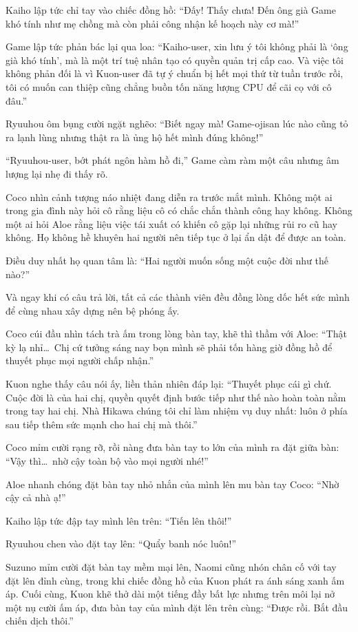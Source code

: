 ﻿\documentclass[../main.tex]{subfiles}
\begin{document}
Kaiho lập tức chỉ tay vào chiếc đồng hồ: ``Đấy! Thấy chưa! Đến ông già Game khó tính như mẹ chồng mà còn phải công nhận kế hoạch này cơ mà!''

Game lập tức phản bác lại qua loa: ``Kaiho-user, xin lưu ý tôi không phải là `ông già khó tính', mà là một trí tuệ nhân tạo có quyền quản trị cấp cao. Và việc tôi không phản đối là vì Kuon-user đã tự ý chuẩn bị hết mọi thứ từ tuần trước rồi, tôi có muốn can thiệp cũng chẳng buồn tốn năng lượng CPU để cãi cọ với cô đâu.''

Ryuuhou ôm bụng cười ngặt nghẽo: ``Biết ngay mà! Game-ojisan lúc nào cũng tỏ ra lạnh lùng nhưng thật ra là ủng hộ hết mình đúng không!''

``Ryuuhou-user, bớt phát ngôn hàm hồ đi,'' Game càm ràm một câu nhưng âm lượng lại nhẹ đi thấy rõ.

Coco nhìn cảnh tượng náo nhiệt đang diễn ra trước mắt mình.  Không một ai trong gia đình này hỏi cô rằng liệu cô có chắc chắn thành công hay không. Không một ai hỏi Aloe rằng liệu việc tái xuất có khiến cô gặp lại những rủi ro cũ hay không. Họ không hề khuyên hai người nên tiếp tục ở lại ẩn dật để được an toàn.

Điều duy nhất họ quan tâm là: ``Hai người muốn sống một cuộc đời như thế nào?''

Và ngay khi có câu trả lời, tất cả các thành viên đều đồng lòng dốc hết sức mình để cùng nhau xây dựng nên bệ phóng ấy.

Coco cúi đầu nhìn tách trà ấm trong lòng bàn tay, khẽ thì thầm với Aloe: ``Thật kỳ lạ nhỉ\dots\ Chị cứ tưởng sáng nay bọn mình sẽ phải tốn hàng giờ đồng hồ để thuyết phục mọi người chấp nhận.''

Kuon nghe thấy câu nói ấy, liền thản nhiên đáp lại: ``Thuyết phục cái gì chứ. Cuộc đời là của hai chị, quyền quyết định bước tiếp như thế nào hoàn toàn nằm trong tay hai chị. Nhà Hikawa chúng tôi chỉ làm nhiệm vụ duy nhất: luôn ở phía sau tiếp thêm sức mạnh cho hai chị mà thôi.''

Coco mỉm cười rạng rỡ, rồi nàng đưa bàn tay to lớn của mình ra đặt giữa bàn: ``Vậy thì\dots\ nhờ cậy toàn bộ vào mọi người nhé!''

Aloe nhanh chóng đặt bàn tay nhỏ nhắn của mình lên mu bàn tay Coco: ``Nhờ cậy cả nhà ạ!''

Kaiho lập tức đập tay mình lên trên: ``Tiến lên thôi!''

Ryuuhou chen vào đặt tay lên: ``Quẩy banh nóc luôn!''

Suzuno mỉm cười đặt bàn tay mềm mại lên, Naomi cũng nhón chân cố với tay đặt lên đỉnh cùng, trong khi chiếc đồng hồ của Kuon phát ra ánh sáng xanh ấm áp. Cuối cùng, Kuon khẽ thở dài một tiếng đầy bất lực nhưng trên môi lại nở một nụ cười ấm áp, đưa bàn tay của mình đặt lên trên cùng: ``Được rồi. Bắt đầu chiến dịch thôi.''
\end{document}

